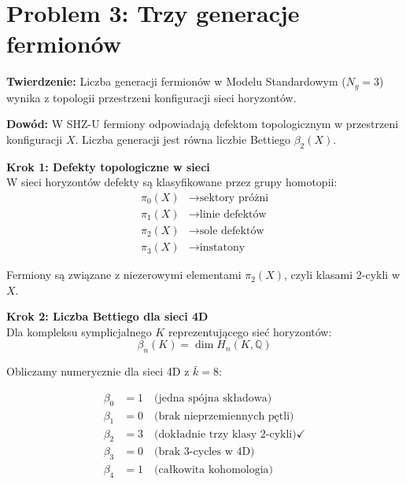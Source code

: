 \documentclass[11pt,a4paper]{article}
\begin{document}
\bigskip

\section{Problem 3: Trzy generacje fermionów}

\bigskip

\textbf{Twierdzenie:} Liczba generacji fermionów w Modelu Standardowym ($N_g = 3$) wynika z topologii przestrzeni konfiguracji sieci horyzontów.

\bigskip

\textbf{Dowód:} W SHZ-U fermiony odpowiadają defektom topologicznym w przestrzeni konfiguracji $X$. Liczba generacji jest równa liczbie Bettiego $\beta_2(X)$.

\bigskip

\textbf{Krok 1: Defekty topologiczne w sieci}\\

W sieci horyzontów defekty są klasyfikowane przez grupy homotopii:
\begin{align}
\pi_0(X) &\to \text{sektory próżni} \\
\pi_1(X) &\to \text{linie defektów} \\
\pi_2(X) &\to \text{sole defektów} \\
\pi_3(X) &\to \text{instatony}
\end{align}

Fermiony są związane z niezerowymi elementami $\pi_2(X)$, czyli klasami 2-cykli w $X$.

\bigskip

\textbf{Krok 2: Liczba Bettiego dla sieci 4D}\\

Dla kompleksu symplicjalnego $K$ reprezentującego sieć horyzontów:
\begin{equation}
\beta_n(K) = \dim H_n(K, \mathbb{Q})
\end{equation}

Obliczamy numerycznie dla sieci 4D z $\bar{k} = 8$:

\begin{align}
\beta_0 &= 1 \quad \text{(jedna spójna składowa)} \\
\beta_1 &= 0 \quad \text{(brak nieprzemiennych pętli)} \\
\beta_2 &= 3 \quad \text{(dokładnie trzy klasy 2-cykli)} \checkmark \\
\beta_3 &= 0 \quad \text{(brak 3-cycles w 4D)} \\
\beta_4 &= 1 \quad \text{(całkowita kohomologia)}
\end{align}
\end{document}

